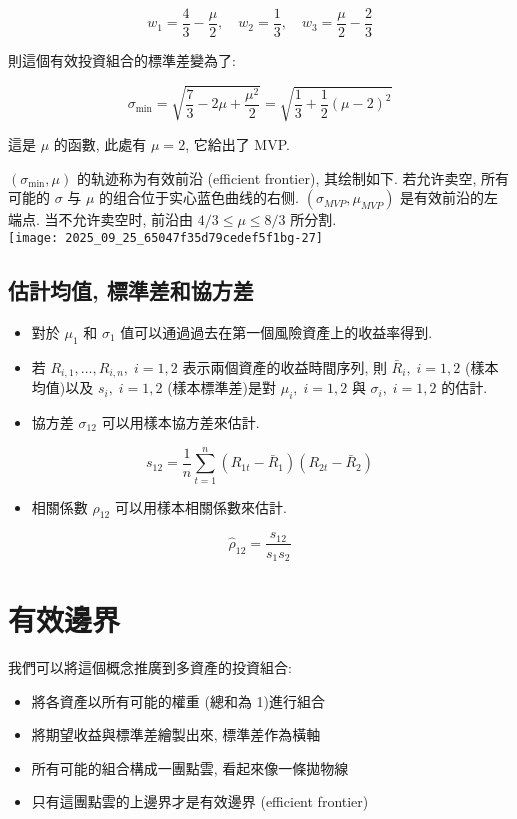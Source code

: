 \documentclass[letterpaper]{article}
\begin{document}
		
		$$
		w_{1}=\frac{4}{3}-\frac{\mu}{2}, \quad w_{2}=\frac{1}{3}, \quad w_{3}=\frac{\mu}{2}-\frac{2}{3}
		$$
		
		則這個有效投資組合的標準差變為了: 
		
		$$
		\sigma_{\min }=\sqrt{\frac{7}{3}-2 \mu+\frac{\mu^{2}}{2}}=\sqrt{\frac{1}{3}+\frac{1}{2} (\mu-2)^{2}}
		$$
		
		這是 $\mu$ 的函數, 此處有 $\mu=2$, 它給出了 MVP.
		
		$\left (\sigma_{\min}, \mu\right)$ 的轨迹称为有效前沿 (efficient frontier), 其绘制如下. 若允许卖空, 所有可能的 $\sigma$ 与 $\mu$ 的组合位于实心蓝色曲线的右侧. $ (\sigma_{MVP}, \mu_{MVP})$ 是有效前沿的左端点. 当不允许卖空时, 前沿由 $4/3 \leq \mu \leq 8/3$ 所分割. \\
		
		
		\texttt{[image: 2025\_09\_25\_65047f35d79cedef5f1bg-27]}
		
		\subsection{估計均值, 標準差和協方差}
		\begin{itemize}
			\item 對於 $\mu_{1}$ 和 $\sigma_{1}$ 值可以通過過去在第一個風險資產上的收益率得到. 
			\item 若 $R_{i, 1}, \ldots, R_{i, n}, \; i=1, 2$ 表示兩個資產的收益時間序列, 則 $\bar{R}_{i}, \; i=1, 2$ (樣本均值)以及 $s_{i}, \; i=1, 2$ (樣本標準差)是對 $\mu_{i}, \; i=1, 2$ 與 $\sigma_{i}, \; i=1, 2$ 的估計. 
			\item 協方差 $\sigma_{12}$ 可以用樣本協方差來估計.
		\end{itemize}
		
		$$
		s_{12}=\frac{1}{n} \sum_{t=1}^{n}\left (R_{1 t}-\bar{R}_{1}\right)\left (R_{2 t}-\bar{R}_{2}\right)
		$$
		
		\begin{itemize}
			\item 相關係數 $\rho_{12}$ 可以用樣本相關係數來估計. 
		\end{itemize}
		
		$$
		\hat{\rho}_{12}=\frac{s_{12}}{s_{1} s_{2}}
		$$
		
		\section{有效邊界}
		我們可以將這個概念推廣到多資產的投資組合: 
		
		\begin{itemize}
			\item 將各資產以所有可能的權重 (總和為 1)進行組合
			\item 將期望收益與標準差繪製出來, 標準差作為橫軸
			\item 所有可能的組合構成一團點雲, 看起來像一條拋物線
			\item 只有這團點雲的上邊界才是有效邊界 (efficient frontier)
		\end{itemize}
		
\end{document}

